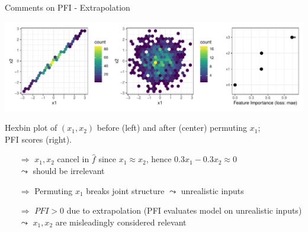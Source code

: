 \documentclass[10pt,compress,t,notes=noshow, xcolor=table]{beamer}
\begin{document}
\begin{frame}{Comments on PFI - Extrapolation}
\pause
\centerline{\includegraphics[width=\linewidth]{figure_man/pfi_hexbin_extrapolation.pdf}}

Hexbin plot of $(x_1, x_2)$ before (left) and after (center) permuting $x_1$;  
\\PFI scores (right).

\pause

\begin{itemize}
  \item[$\Rightarrow$] $x_1, x_2$ cancel in $\hat{f}$ since $x_1 \approx x_2$, hence $0.3 x_1 - 0.3 x_2 \approx 0$ \\$\leadsto$ should be irrelevant
  \item[$\Rightarrow$] Permuting $x_1$ breaks joint structure $\leadsto$ unrealistic inputs
  \item[$\Rightarrow$] $PFI > 0$ due to extrapolation (PFI evaluates model on unrealistic inputs)\\ $\leadsto$ $x_1, x_2$ are misleadingly considered relevant
\end{itemize}

\end{frame}
\end{document}

